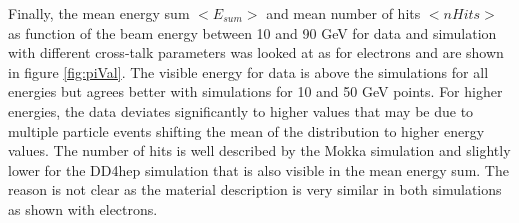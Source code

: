 Finally, the mean energy sum $<E_{sum}>$ and mean number of hits $<nHits>$ as function of the beam energy between 10 and 90 GeV for data and simulation with different cross-talk parameters was looked at as for electrons and are shown in figure \ref{fig:piVal}. The visible energy for data is above the simulations for all energies but agrees better with simulations for 10 and 50 GeV points. For higher energies, the data deviates significantly to higher values that may be due to multiple particle events shifting the mean of the distribution to higher energy values. The number of hits is well described by the Mokka simulation and slightly lower for the DD4hep simulation that is also visible in the mean energy sum. The reason is not clear as the material description is very similar in both simulations as shown with electrons.

